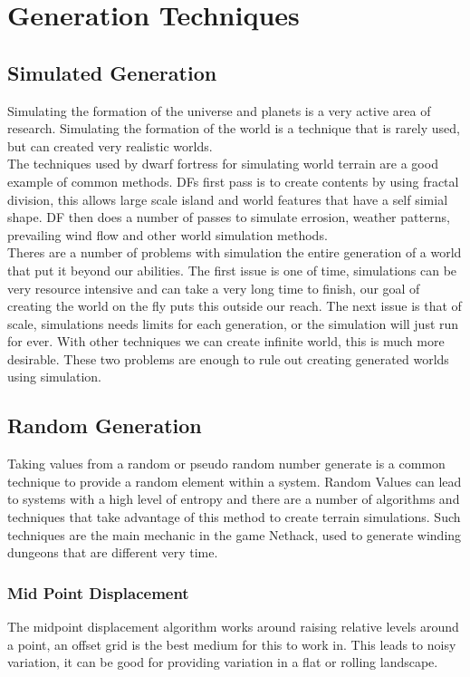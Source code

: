 \section{Generation Techniques}

\subsection{Simulated Generation}
Simulating the formation of the universe and planets is a very active area of 
research. Simulating the formation of the world is a technique that is rarely
used, but can created very realistic worlds.\\

The techniques used by dwarf fortress for simulating world terrain are a good
example of common methods. DFs first pass is to create contents by using fractal
division, this allows large scale island and world features that have a self 
simial shape. DF then does a number of passes to simulate errosion, weather 
patterns, prevailing wind flow and other world simulation methods.\\

Theres are a number of problems with
simulation the entire generation of a world that put it beyond our abilities. 
The first issue is one of time, simulations can be very resource intensive and 
can take a very long time to finish, our goal of creating the world on the fly 
puts this outside our reach. The next issue is that of scale, simulations needs
limits for each generation, or the simulation will just run for ever. With other
techniques we can create infinite world, this is much more desirable. These two
problems are enough to rule out creating generated worlds using simulation.\\

\subsection{Random Generation}
Taking values from a random or pseudo random number generate is a common 
technique to provide a random element within a system. Random Values can lead to
systems with a high level of entropy and there are a number of algorithms and 
techniques that take advantage of this method to create terrain simulations. Such
techniques are the main mechanic in the game Nethack, used to generate winding
dungeons that are different very time.\\

\subsubsection*{Mid Point Displacement}
The midpoint displacement algorithm works around raising relative levels around a
point, an offset grid is the best medium for this to work in. This leads to noisy
variation, it can be good for providing variation in a flat or rolling landscape.\\

